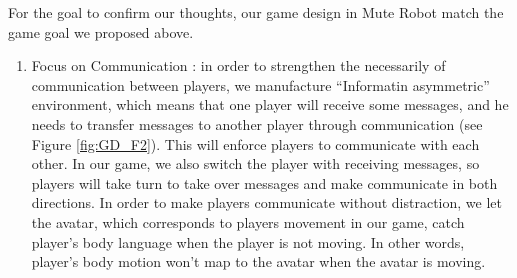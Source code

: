 \documentclass{sigchi}
\begin{document}
For the goal to confirm our thoughts, our game design in Mute Robot match the game goal we proposed above.
\begin{enumerate}
\item Focus on Communication : 
in order to strengthen the necessarily of communication between players, we manufacture ``Informatin asymmetric'' environment, which means that one player will receive some messages, and he needs to transfer messages to another player through communication (see Figure \ref{fig:GD_F2}). This will enforce players to communicate with each other. In our game, we also switch the player with receiving messages, so players will take turn to take over messages and make communicate in both directions. In order to make players communicate without distraction, we let the avatar, which corresponds to players movement in our game, catch player's body language when the player is not moving. In other words, player's body motion won't map to the avatar when the avatar is moving.


\end{enumerate}
\end{document}

